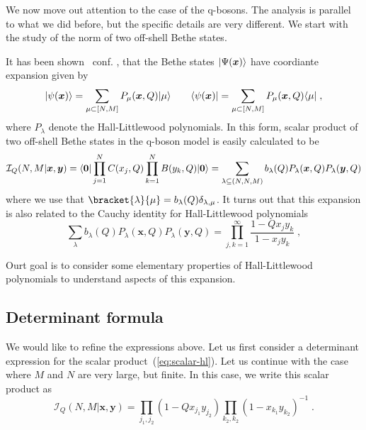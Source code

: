 \documentclass[a4paper,11pt]{amsart}
\begin{document}
We now move out attention to the case of the q-bosons. The 
analysis is parallel to what we did before, but the  specific 
details are very different. We start with the study of the norm of  
two off-shell Bethe states. 

It has been shown~\cite{Tsilevich:2006} conf. \cite{Sulkowski:2008mx,
  Wheeler:2010vmq}, that the Bethe states \(\lvert\Psi(\bm{x})\rangle\) have 
coordiante expansion given by
\begin{equation}
  \lvert\psi(\bm{x})\rangle = \sum_{\mu \subset [N,M]} P_\mu(\bm{x}, Q) \lvert\mu\rangle  \qquad 
  \langle\psi(\bm{x})\rvert = \sum_{\mu \subset [N,M]} P_\mu(\bm{x}, Q) \langle\mu\rvert\; ,
\end{equation}
where \(P_\lambda\) denote the Hall-Littlewood polynomials.  In this
form, scalar product of two off-shell Bethe states in the q-boson
model is easily calculated to be
\begin{equation}
\label{eq:scalar-hl}
\mathcal{I}_Q(N,M | \bm{x}, \bm{y}) = \langle\bm{0}\rvert \prod_{j=1}^N C(x_j, Q)
\prod_{k=1}^N B(y_k, Q) \lvert\bm{0}\rangle
= \sum_{\lambda \subseteq
  (N,N,M)} b_\lambda(Q) P_{\lambda}(\bm{x}, Q) P_{\lambda}(\bm{y}, Q)
\end{equation}
where we use that \(\bracket{\lambda}{\mu} = b_\lambda(Q)
\delta_{\lambda, \mu}\).  It turns out that this expansion is also
related to the Cauchy identity for Hall-Littlewood
polynomials~\cite{Macdonald:1998}
\begin{equation}
\label{eq:cauchy_hl}
\sum_{\lambda} b_\lambda(Q) P_{\lambda}(\bm{x}, Q) P_{\lambda}(\bm{y}, Q)
= \prod_{j, k=1}^\infty \frac{1-Q x_j y_k}{1 - x_j y_k}\; ,
\end{equation}

Ourt goal is to consider some elementary properties of Hall-Littlewood polynomials 
to understand aspects of this expansion. 


\subsection{Determinant formula}

We would like to refine the expressions above.  Let us first consider
a determinant expression for the scalar product~(\ref{eq:scalar-hl}).
Let us continue with the case where \(M\) and \(N\) are very large,
but finite. In this case, we write this scalar product as
\begin{equation}
  \mathcal{I}_Q(N,M | \bm{x}, \bm{y})  
= \prod_{j_1, j_2} (1-Q x_{j_1} y_{j_2}) \prod_{k_2, k_2}(1 - x_{k_1} y_{k_2})^{-1}\; .
\end{equation}
\end{document}

